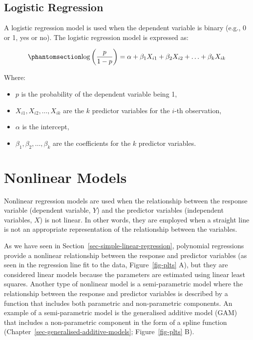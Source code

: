 \documentclass[
  letterpaper,
]{book}
\providecommand{\tightlist}{%
  \setlength{\itemsep}{0pt}\setlength{\parskip}{0pt}}\usepackage{longtable,booktabs,array}
\begin{document}
\section{Logistic Regression}\label{logistic-regression}

A logistic regression model is used when the dependent variable is
binary (e.g., 0 or 1, yes or no). The logistic regression model is
expressed as:

\begin{equation}\phantomsection\label{eq-logit}{\log\left(\frac{p}{1-p}\right) = \alpha + \beta_1 X_{i1} + \beta_2 X_{i2} + \ldots + \beta_k X_{ik}}\end{equation}

Where:

\begin{itemize}
\tightlist
\item
  \(p\) is the probability of the dependent variable being 1,
\item
  \(X_{i1}, X_{i2}, \ldots, X_{ik}\) are the \(k\) predictor variables
  for the \(i\)-th observation,
\item
  \(\alpha\) is the intercept,
\item
  \(\beta_1, \beta_2, \ldots, \beta_k\) are the coefficients for the
  \(k\) predictor variables.
\end{itemize}

\chapter{Nonlinear Models}\label{sec-nonlinear-regression}

Nonlinear regression models are used when
the relationship between the response variable (dependent variable,
\(Y\)) and the predictor variables (independent variables, \(X\)) is not
linear. In other words, they are employed when a straight line is not an
appropriate representation of the relationship between the variables.

As we have seen in Section~\ref{sec-simple-linear-regression},
polynomial regressions provide a nonlinear relationship between the
response and predictor variables (as seen in the regression line fit to
the data, Figure~\ref{fig-plts} A), but they are considered linear
models because the parameters are estimated using linear least squares.
Another type of nonlinear model is a semi-parametric model where the
relationship between the response and predictor variables is described
by a function that includes both parametric and non-parametric
components. An example of a semi-parametric model is the generalised
additive model (GAM) that includes a non-parametric component in the
form of a spline function
(Chapter~\ref{sec-generalised-additive-models}; Figure~\ref{fig-plts}
B).
\end{document}
